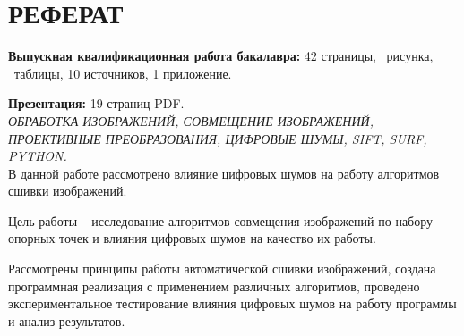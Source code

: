
\def\l@subsection{\@dottedtocline{2}{3.8em}{3.2em}}
\setcounter{tocdepth}{2}



\newcommand{\incpic}[3]{
	\begin{figure}[H] 
		\begin{center} 
			\texttt{[image: \#1]} 
			\caption{#2}
			\label{#3} 
		\end{center}
	\end{figure} 
}




\setcounter{page}{3}
\setcounter{secnumdepth}{3}

\section*{РЕФЕРАТ}
{
	{\bf Выпускная квалификационная работа бакалавра:}
	42 страницы,
	\totalfigures\ рисунка,
	\totaltables\ таблицы,
	10 источников,
	1 приложение.
	
	{\bf Презентация:} 19 страниц PDF.\\
	
	\textit{ОБРАБОТКА ИЗОБРАЖЕНИЙ, СОВМЕЩЕНИЕ ИЗОБРАЖЕНИЙ, ПРОЕКТИВНЫЕ ПРЕОБРАЗОВАНИЯ, ЦИФРОВЫЕ ШУМЫ, SIFT, SURF, PYTHON.}\\
	
	В данной работе рассмотрено влияние цифровых шумов на работу алгоритмов сшивки изображений.
	
	Цель работы -- исследование алгоритмов совмещения изображений по набору опорных точек и влияния цифровых шумов на качество их работы.
	
	Рассмотрены принципы работы автоматической сшивки изображений, создана программная реализация с применением различных алгоритмов, проведено экспериментальное тестирование влияния цифровых шумов на работу программы и анализ результатов.
}
\newpage

